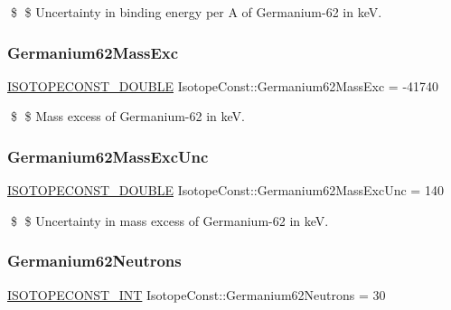 \$ \$ Uncertainty in binding energy per A of Germanium-\/62 in keV. \mbox{\label{group___isotope_const-_germanium-_ge62_gadb33c0682609cbe1b52edae4c3af20bc}} 
\subsubsection{\texorpdfstring{Germanium62\+Mass\+Exc}{Germanium62MassExc}}
{\footnotesize\ttfamily \mbox{\hyperlink{group___isotope_const-_macros_ga8f45a7272ce02c0b4c65c44636ed719a}{I\+S\+O\+T\+O\+P\+E\+C\+O\+N\+S\+T\+\_\+\+D\+O\+U\+B\+LE}} Isotope\+Const\+::\+Germanium62\+Mass\+Exc = -\/41740}

\$ \$ Mass excess of Germanium-\/62 in keV. \mbox{\label{group___isotope_const-_germanium-_ge62_ga6c3ea7e6fbf39564e13b92374cced442}} 
\subsubsection{\texorpdfstring{Germanium62\+Mass\+Exc\+Unc}{Germanium62MassExcUnc}}
{\footnotesize\ttfamily \mbox{\hyperlink{group___isotope_const-_macros_ga8f45a7272ce02c0b4c65c44636ed719a}{I\+S\+O\+T\+O\+P\+E\+C\+O\+N\+S\+T\+\_\+\+D\+O\+U\+B\+LE}} Isotope\+Const\+::\+Germanium62\+Mass\+Exc\+Unc = 140}

\$ \$ Uncertainty in mass excess of Germanium-\/62 in keV. \mbox{\label{group___isotope_const-_germanium-_ge62_ga24ad6f074fe2453a469978283abe35ef}} 
\subsubsection{\texorpdfstring{Germanium62\+Neutrons}{Germanium62Neutrons}}
{\footnotesize\ttfamily \mbox{\hyperlink{group___isotope_const-_macros_ga5f18360b3e99483a35c32d789e62621c}{I\+S\+O\+T\+O\+P\+E\+C\+O\+N\+S\+T\+\_\+\+I\+NT}} Isotope\+Const\+::\+Germanium62\+Neutrons = 30}

